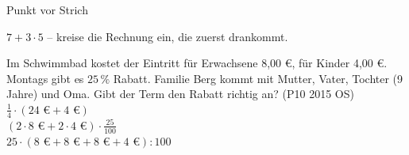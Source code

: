 \setcounter{aufgabe}{25}

\begin{aufgabe}{Punkt vor Strich}
\begin{teile}
\teil $7 + 3 \cdot 5$ – kreise die Rechnung ein, die zuerst drankommt.
\end{teile}
\begin{teile}
\teil Im Schwimmbad kostet der Eintritt für Erwachsene 8,00 €, für Kinder 4,00 €. Montags gibt es $25\,\%$ Rabatt. Familie Berg kommt mit Mutter, Vater, Tochter (9 Jahre) und Oma. Gibt der Term den Rabatt richtig an? \hfill (P10 2015 OS)\\
$\frac{1}{4} \cdot (24\text{ €} + 4\text{ €})$ \janein\\
$(2 \cdot 8\text{ €} + 2 \cdot 4\text{ €}) \cdot \frac{25}{100}$ \janein\\
$25 \cdot (8\text{ €} + 8\text{ €} + 8\text{ €} + 4\text{ €}) : 100$ \janein
\end{teile}
\end{aufgabe}

